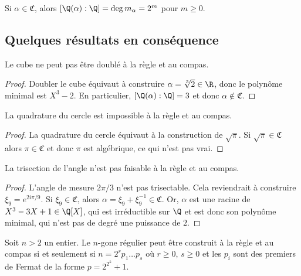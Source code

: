 \documentclass[math, info]{mpb-cours}
\def\fC{\mathfrak{C}}
\begin{document}
\begin{corollaire}
	Si $\alpha \in \fC$, alors $[\Q(\alpha):\Q] = \deg m_{\alpha} = 2^m$ pour $m\geq 0$.
\end{corollaire}

\subsection{Quelques résultats en conséquence}
\begin{proposition}
	Le cube ne peut pas être doublé à la règle et au compas.
\end{proposition}
\begin{proof}
	Doubler le cube équivaut à construire $\alpha = \sqrt[3]{2} \in \R$, donc le polynôme minimal est
	$X^{3} - 2$. En particulier, $[\Q(\alpha):\Q] = 3$ et donc $\alpha \notin\fC$.
\end{proof}

\begin{proposition}
	La quadrature du cercle est impossible à la règle et au compas.
\end{proposition}
\begin{proof}
	La quadrature du cercle équivaut à la construction de $\sqrt{\pi}$.
	Si $\sqrt{\pi} \in \fC$ alors $\pi \in \fC$ et donc $\pi$ est algébrique, ce qui n'est pas vrai.
\end{proof}

\begin{proposition}
	La trisection de l'angle n'est pas faisable à la règle et au compas.
\end{proposition}
\begin{proof}
	L'angle de mesure $2\pi/3$ n'est pas trisectable. Cela reviendrait à construire $\xi_{9} = e^{2i\pi/9}$.
	Si $\xi_{9} \in \fC$, alors $\alpha = \xi_{9} + \xi_{9}^{-1} \in \fC$.
	Or, $\alpha$ est une racine de $X^{3} -3X + 1 \in \Q[X]$, qui est irréductible sur $\Q$ et est donc son
	polynôme minimal, qui n'est pas de degré une puissance de $2$.
\end{proof}

\begin{proposition}
	Soit $n > 2$ un entier. Le $n$-gone régulier peut être construit à la règle et au compas si et seulement
	si $n = 2^{r}p_{1}\ldots p_{s}$ où $r \geq 0$, $s\geq 0$ et les $p_{i}$ sont des premiers de Fermat de la
	forme $p = 2^{2^{k}} + 1$.
\end{proposition}
\end{document}
